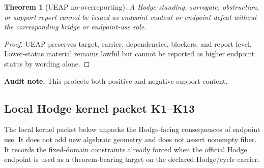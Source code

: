 \documentclass[11pt]{article}
\newtheorem{theorem}{Theorem}[section]
\begin{document}
\begin{theorem}[UEAP no-overreporting]
A Hodge-standing, surrogate, obstruction, or support report cannot be issued as endpoint readout or endpoint defeat without the corresponding bridge or endpoint-use role.
\end{theorem}
\begin{proof}
UEAP preserves target, carrier, dependencies, blockers, and report level. Lower-status material remains lawful but cannot be reported as higher endpoint status by wording alone.
\end{proof}
\par\noindent\textbf{Audit note.} This protects both positive and negative support content.


\subsection{Local Hodge kernel packet K1--K13}

The local kernel packet below unpacks the Hodge-facing consequences of endpoint use.  It does not add new algebraic geometry and does not assert nonempty fiber.  It records the fixed-domain constraints already forced when the official Hodge endpoint is used as a theorem-bearing target on the declared Hodge/cycle carrier.
\end{document}
